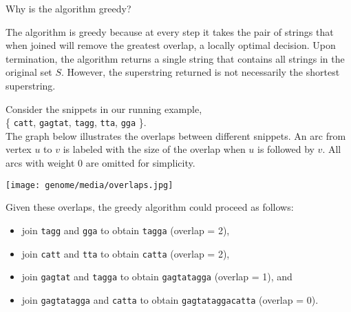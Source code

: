 \begin{flex}
\label{grp:xrcs:genome::greedy}

\begin{exercise}
\label{xrcs:genome::greedy}
Why is the algorithm greedy?

\end{exercise}

\begin{solution}
\label{sol:genome::greedy}
The algorithm is greedy because at every step it takes the pair of
strings that when joined will remove the greatest overlap, a locally
optimal decision.  Upon termination, the algorithm returns a single
string that contains all strings in the original set $S$.  However,
the superstring returned is not necessarily the shortest superstring.

\end{solution}
\end{flex}

\begin{cluster}
\label{grp:xmpl:genome::consider}

\begin{example}
\label{xmpl:genome::consider}
Consider the snippets in our running example, \\
\Big\{
\texttt{catt}, \texttt{gagtat}, \texttt{tagg}, \texttt{tta},
\texttt{gga}
\Big\}.  
\\
The graph below illustrates the overlaps between different snippets.
An arc from vertex $u$ to $v$ is labeled with the size of the overlap
when $u$ is followed by $v$.
All arcs with weight $0$ are omitted for simplicity.
\begin{center}
\texttt{[image: genome/media/overlaps.jpg]}
\end{center}

Given these overlaps, the greedy algorithm could proceed as follows:
\begin{itemize}
\item join \texttt{tagg} and \texttt{gga} to obtain \texttt{tagga}
  (overlap = 2),
\item join \texttt{catt} and \texttt{tta} to obtain \texttt{catta}
  (overlap = 2),
\item join \texttt{gagtat} and \texttt{tagga}  to obtain
  \texttt{gagtatagga} (overlap = 1), and
\item join \texttt{gagtatagga} and \texttt{catta} to obtain
  \texttt{gagtataggacatta} (overlap = 0).
\end{itemize} 

\end{example}
\end{cluster}


